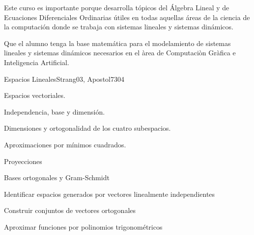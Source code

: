 \begin{syllabus}


\begin{justification}
Este curso es importante porque desarrolla tópicos del Álgebra Lineal y de Ecuaciones Diferenciales Ordinarias útiles en todas aquellas áreas de la ciencia de la computación donde se trabaja con sistemas lineales y sistemas dinámicos.
\end{justification}

\begin{goals}
\item Que el alumno tenga la base matemática para el modelamiento de sistemas lineales y sistemas dinámicos necesarios en el àrea de Computaciòn Gràfica e Inteligencia Artificial.
\end{goals}

\begin{competences}
\item {}
\end{competences}

\begin{outcomes}
\item {}
\item {}
\item {}
\end{outcomes}

\begin{unit}{Espacios Lineales}{Strang03, Apostol73}{0}{4}
\begin{topics}
      \item Espacios vectoriales.
      \item Independencia, base y dimensión.
      \item Dimensiones y ortogonalidad de los cuatro subespacios.
      \item Aproximaciones por mínimos cuadrados.
      \item Proyecciones
      \item Bases ortogonales y Gram-Schmidt
   \end{topics}

   \begin{learningoutcomes}
      \item Identificar espacios generados por vectores linealmente independientes
      \item Construir conjuntos de vectores ortogonales
      \item Aproximar funciones por polinomios trigonométricos
   \end{learningoutcomes}
\end{unit}


\end{syllabus}
